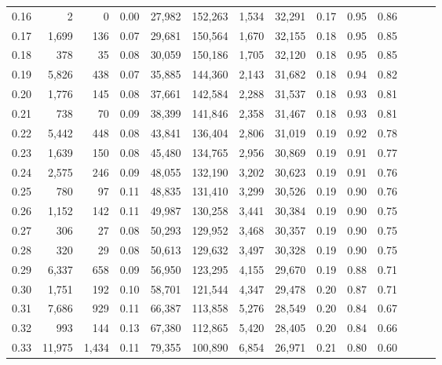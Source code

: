 \begin{tabular}{rrrrrrrrrrrrrr}
0.16 &       2 &      0 &  0.00 &   27,982 &  152,263 &   1,534 &  32,291 &  0.17 &  0.95 &      0.86 \\
0.17 &   1,699 &    136 &  0.07 &   29,681 &  150,564 &   1,670 &  32,155 &  0.18 &  0.95 &      0.85 \\
0.18 &     378 &     35 &  0.08 &   30,059 &  150,186 &   1,705 &  32,120 &  0.18 &  0.95 &      0.85 \\
0.19 &   5,826 &    438 &  0.07 &   35,885 &  144,360 &   2,143 &  31,682 &  0.18 &  0.94 &      0.82 \\
0.20 &   1,776 &    145 &  0.08 &   37,661 &  142,584 &   2,288 &  31,537 &  0.18 &  0.93 &      0.81 \\
0.21 &     738 &     70 &  0.09 &   38,399 &  141,846 &   2,358 &  31,467 &  0.18 &  0.93 &      0.81 \\
0.22 &   5,442 &    448 &  0.08 &   43,841 &  136,404 &   2,806 &  31,019 &  0.19 &  0.92 &      0.78 \\
0.23 &   1,639 &    150 &  0.08 &   45,480 &  134,765 &   2,956 &  30,869 &  0.19 &  0.91 &      0.77 \\
0.24 &   2,575 &    246 &  0.09 &   48,055 &  132,190 &   3,202 &  30,623 &  0.19 &  0.91 &      0.76 \\
0.25 &     780 &     97 &  0.11 &   48,835 &  131,410 &   3,299 &  30,526 &  0.19 &  0.90 &      0.76 \\
0.26 &   1,152 &    142 &  0.11 &   49,987 &  130,258 &   3,441 &  30,384 &  0.19 &  0.90 &      0.75 \\
0.27 &     306 &     27 &  0.08 &   50,293 &  129,952 &   3,468 &  30,357 &  0.19 &  0.90 &      0.75 \\
0.28 &     320 &     29 &  0.08 &   50,613 &  129,632 &   3,497 &  30,328 &  0.19 &  0.90 &      0.75 \\
0.29 &   6,337 &    658 &  0.09 &   56,950 &  123,295 &   4,155 &  29,670 &  0.19 &  0.88 &      0.71 \\
0.30 &   1,751 &    192 &  0.10 &   58,701 &  121,544 &   4,347 &  29,478 &  0.20 &  0.87 &      0.71 \\
0.31 &   7,686 &    929 &  0.11 &   66,387 &  113,858 &   5,276 &  28,549 &  0.20 &  0.84 &      0.67 \\
0.32 &     993 &    144 &  0.13 &   67,380 &  112,865 &   5,420 &  28,405 &  0.20 &  0.84 &      0.66 \\
0.33 &  11,975 &  1,434 &  0.11 &   79,355 &  100,890 &   6,854 &  26,971 &  0.21 &  0.80 &      0.60 \\

\end{tabular}

